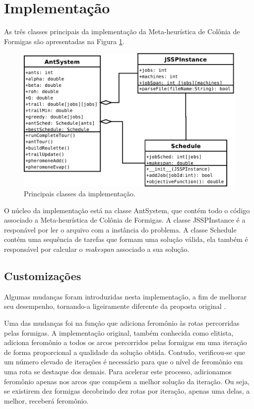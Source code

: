 \section{Implementação}
As três classes principais da implementação da Meta-heurística de Colônia de Formigas são apresentadas
na Figura \ref{fig:modelo_aep}.

\begin{figure}[ht]
  \centering
  \includegraphics[scale=0.4]{./fig/modelo_aep.pdf}
  \caption{Principais classes da implementação.}
  \label{fig:modelo_aep}
\end{figure}

O núcleo da implementação está na classe AntSystem, que contém todo o código associado a Meta-heurística
de Colônia de Formigas.
A classe JSSPInstance é a responável por ler o arquivo com a instância do problema. A classe Schedule
contém uma sequência de tarefas que formam uma solução válida, ela também é responsável por calcular
o \textit{makespan} associado a sua solução.


\subsection{Customizações}
Algumas mudanças foram introduzidas nesta implementação, a fim de melhorar seu desempenho,
tornando-a ligeiramente diferente da proposta original \cite{colorni1994ant}.

Uma das mudanças foi na função que adiciona feromônio às rotas percorridas pelas formigas. A implementação
original, também conhecida como elitista, adiciona feromônio a todos os arcos percorridos pelas formigas em 
uma iteração de forma proporcional a qualidade da solução obtida. Contudo, verificou-se que um número elevado
de iterações é necessário para que o nível de feromônio em uma rota se destaque dos demais. Para acelerar este 
processo, adicionamos feromônio apenas nos arcos que compõem a melhor solução da iteração. Ou seja, se existirem
dez formigas decobrindo dez rotas por iteração, apenas uma delas, a melhor, receberá feromônio.

